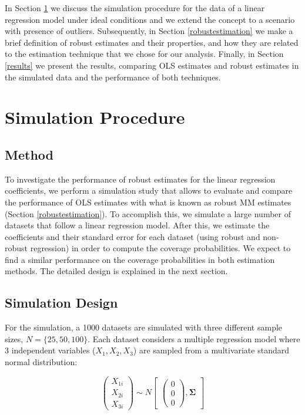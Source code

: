 \documentclass[a4paper]{article}
\begin{document}
In Section \ref{simprocedures} we discuss the simulation procedure for the data of a linear regression model under ideal conditions and we extend the concept to a scenario with presence of outliers. Subsequently, in Section \ref{robustestimation} we make a brief definition of robust estimates and their properties, and how they are related to the estimation technique that we chose for our analysis. Finally, in Section \ref{results} we present the results, comparing OLS estimates and robust estimates in the simulated data and the performance of both techniques.

\section{Simulation Procedure} \label{simprocedures}
\subsection{Method}
To investigate the performance of robust estimates for the linear regression coefficients, we perform a simulation study that allows to evaluate and compare the performance of OLS estimates with what is known as robust MM estimates (Section \ref{robustestimation}). To accomplish this, we simulate a large number of datasets that follow a linear regression model. After this, we estimate the coefficients and their standard error for each dataset (using robust and non-robust regression) in order to compute the coverage probabilities. We expect to find a similar performance on the coverage probabilities in both estimation methods. The detailed design is explained in the next section.  

\subsection{Simulation Design} 
For the simulation, a 1000 datasets are simulated with three different sample sizes, $N=\{25,50,100\}$. Each dataset considers a multiple regression model where 3 independent variables ($X_1, X_2, X_3$) are sampled from a multivariate standard normal distribution:

\begin{equation*}
\left(\begin{array}{c}X_{1i}\\ X_{2i}\\X_{3i}\end{array}\right)\sim N \begin{bmatrix}\left(\begin{array}{c}0\\ 0\\0\end{array}\right), \mathbf{\Sigma} \end{bmatrix}
\end{equation*}
\end{document}

